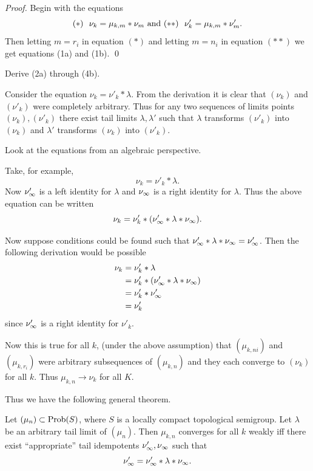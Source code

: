 \begin{proof}  Begin with the equations
\[
     (*) \ \ \nu_k = \mu_{k,m} * \nu_m \hbox{ and }
     (**) \ \ \nu'_k = \mu_{k,m} * \nu'_m.
\]
Then letting $m = r_i$ in equation $(*)$ and letting $m = n_i$ in
equation $(**)$ we get equations (1a) and (1b).
\qed
\end{proof}

  Derive (2a) through (4b).

Consider the equation $\nu_k = \nu'_k * \lambda$.  
From the derivation it is clear that $(\nu_k)$ and $(\nu'_k)$ were completely arbitrary.  
Thus for any two sequences of limits points $(\nu_k),(\nu'_k)$ there exist tail limits $\lambda,\lambda'$ such that $\lambda$ transforms $(\nu'_k)$ into $(\nu_k)$ and $\lambda'$ transforms $(\nu_k)$ into $(\nu'_k)$.

Look at the equations from an algebraic perspective.

Take, for example,
\[
     \nu_k = \nu'_k * \lambda.
\]
Now $\nu'_\infty$ is a left identity for $\lambda$ and $\nu_\infty$ is a right
identity for $\lambda$.  Thus the above equation can be written
\[
     \nu_k = \nu'_k * (\nu'_\infty * \lambda * \nu_\infty).
\]

Now suppose conditions could be found such that $\nu'_\infty * \lambda *
\nu_\infty = \nu'_\infty$.  Then the following derivation would be possible
\[
\begin{aligned}
       \nu_k &= \nu'_k * \lambda                                   \\
       &= \nu'_k * (\nu'_\infty * \lambda * \nu_\infty)                    \\
       &= \nu'_k * \nu'_\infty                                     \\
       &= \nu'_k
\end{aligned}
\]
since $\nu'_\infty$ is a right identity for $\nu'_k$.

Now this is true for all $k$, (under the above assumption) that
$(\mu_{k,ni})$ and $(\mu_{k,r_i})$ were arbitrary subsequences of
$(\mu_{k,n})$ and they each converge to $(\nu_k)$ for all $k$.  
Thus $\mu_{k,n} \to \nu_k$ for all $K$.

Thus we have the following general theorem.


\begin{theorem}		\label{thm:3.7}
  Let $(\mu_n) \subset \hbox{Prob}(S)$, where $S$ is a locally
compact topological semigroup.  Let $\lambda$ be an arbitrary tail limit
of $(\mu_n)$.  Then $\mu_{k,n}$ converges for all $k$ weakly if{f}
there exist ``appropriate'' tail idempotents $\nu'_\infty, \nu_\infty$ such
that
\[
     \nu'_\infty = \nu'_\infty * \lambda * \nu_\infty.
\]
\end{theorem}

